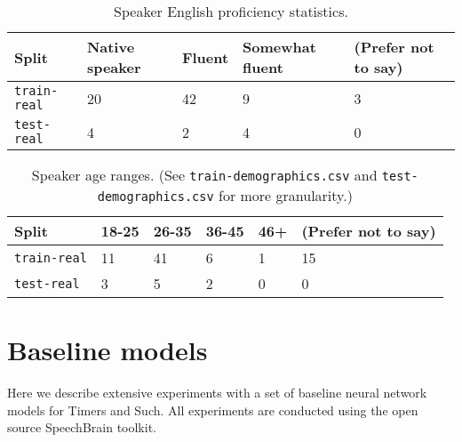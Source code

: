 \documentclass{article}
\begin{document}
\begin{table}[ht]
  \caption{Speaker English proficiency statistics.}
  \centering
  \begin{tabular}{p{20mm}p{11mm}p{11mm}p{11mm}p{15mm}}
    \toprule
    Split & Native speaker & Fluent & Somewhat fluent &
        (Prefer not to say)\\
    \midrule
    \texttt{train-real} & 20 &  42  &  9 & 3 \\
    \texttt{test-real}  & 4  & 2  &  4 & 0 \\
    \bottomrule
  \end{tabular}\label{stats-fluency}
  
\end{table}


\begin{table}[ht]
  \caption{Speaker age ranges. (See \texttt{train-demographics.csv} and \texttt{test-demographics.csv} for more granularity.)}
  \centering
  \begin{tabular}{p{20mm}p{5mm}p{5mm}p{5mm}p{5mm}p{15mm}}
    \toprule
    Split & 18-25 & 26-35 & 36-45 & 46+ &
        (Prefer not to say)\\
    \midrule
    \texttt{train-real} & 11 & 41 & 6 &  1 & 15 \\
    \texttt{test-real}  & 3 & 5 & 2 & 0 & 0\\
    \bottomrule
  \end{tabular}\label{stats-age}
  
\end{table}

\section{Baseline models}

Here we describe extensive experiments with a set of baseline neural network models for Timers and Such. All experiments are conducted using the open source SpeechBrain \cite{SB2021} toolkit.
\end{document}
